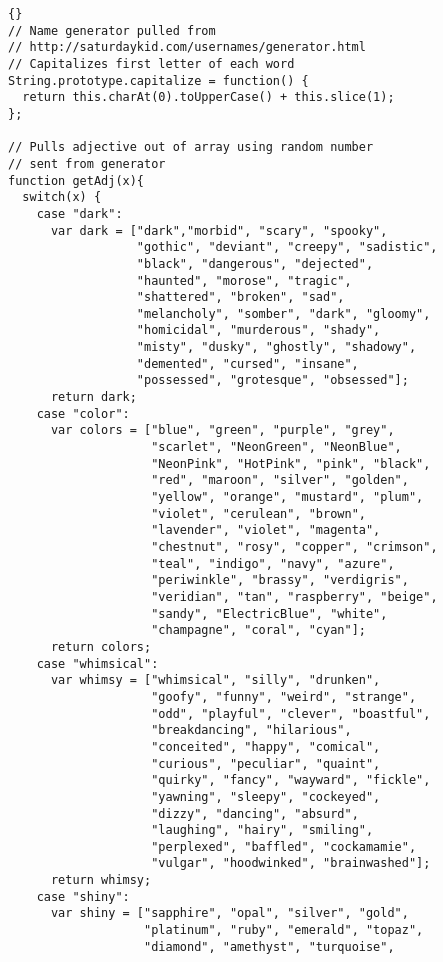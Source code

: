 \documentclass[twoside]{article}
\begin{document}
\begin{lstlisting}{}
// Name generator pulled from 
// http://saturdaykid.com/usernames/generator.html
// Capitalizes first letter of each word
String.prototype.capitalize = function() {
  return this.charAt(0).toUpperCase() + this.slice(1);
};

// Pulls adjective out of array using random number 
// sent from generator
function getAdj(x){
  switch(x) {
    case "dark": 
      var dark = ["dark","morbid", "scary", "spooky", 
                  "gothic", "deviant", "creepy", "sadistic",
                  "black", "dangerous", "dejected", 
                  "haunted", "morose", "tragic", 
                  "shattered", "broken", "sad", 
                  "melancholy", "somber", "dark", "gloomy",
                  "homicidal", "murderous", "shady", 
                  "misty", "dusky", "ghostly", "shadowy", 
                  "demented", "cursed", "insane", 
                  "possessed", "grotesque", "obsessed"];
      return dark;
    case "color": 
      var colors = ["blue", "green", "purple", "grey", 
                    "scarlet", "NeonGreen", "NeonBlue", 
                    "NeonPink", "HotPink", "pink", "black", 
                    "red", "maroon", "silver", "golden", 
                    "yellow", "orange", "mustard", "plum", 
                    "violet", "cerulean", "brown", 
                    "lavender", "violet", "magenta",
                    "chestnut", "rosy", "copper", "crimson",
                    "teal", "indigo", "navy", "azure", 
                    "periwinkle", "brassy", "verdigris", 
                    "veridian", "tan", "raspberry", "beige",
                    "sandy", "ElectricBlue", "white", 
                    "champagne", "coral", "cyan"];
      return colors;
    case "whimsical": 
      var whimsy = ["whimsical", "silly", "drunken", 
                    "goofy", "funny", "weird", "strange", 
                    "odd", "playful", "clever", "boastful",
                    "breakdancing", "hilarious", 
                    "conceited", "happy", "comical", 
                    "curious", "peculiar", "quaint", 
                    "quirky", "fancy", "wayward", "fickle", 
                    "yawning", "sleepy", "cockeyed", 
                    "dizzy", "dancing", "absurd", 
                    "laughing", "hairy", "smiling", 
                    "perplexed", "baffled", "cockamamie", 
                    "vulgar", "hoodwinked", "brainwashed"];
      return whimsy;
    case "shiny":
      var shiny = ["sapphire", "opal", "silver", "gold", 
                   "platinum", "ruby", "emerald", "topaz", 
                   "diamond", "amethyst", "turquoise", 

\end{lstlisting}
\end{document}

